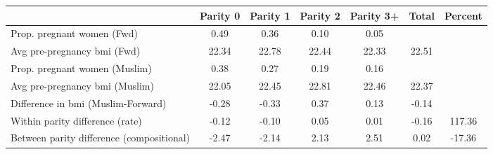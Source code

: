 \begin{tabular}{l*{6}{c}}
\toprule
            &\multicolumn{1}{c}{Parity 0}&\multicolumn{1}{c}{Parity 1}&\multicolumn{1}{c}{Parity 2}&\multicolumn{1}{c}{Parity 3+}&\multicolumn{1}{c}{Total}&\multicolumn{1}{c}{Percent}\\
\midrule
\midrule
Prop. pregnant women (Fwd)&        0.49&        0.36&        0.10&        0.05&            &            \\
Avg pre-pregnancy bmi (Fwd)&       22.34&       22.78&       22.44&       22.33&       22.51&            \\
Prop. pregnant women (Muslim)&        0.38&        0.27&        0.19&        0.16&            &            \\
Avg pre-pregnancy bmi (Muslim)&       22.05&       22.45&       22.81&       22.46&       22.37&            \\
Difference in bmi (Muslim-Forward)&       -0.28&       -0.33&        0.37&        0.13&       -0.14&            \\
Within parity difference (rate)&       -0.12&       -0.10&        0.05&        0.01&       -0.16&      117.36\\
Between parity difference (compositional)&       -2.47&       -2.14&        2.13&        2.51&        0.02&      -17.36\\
\bottomrule
\end{tabular}
